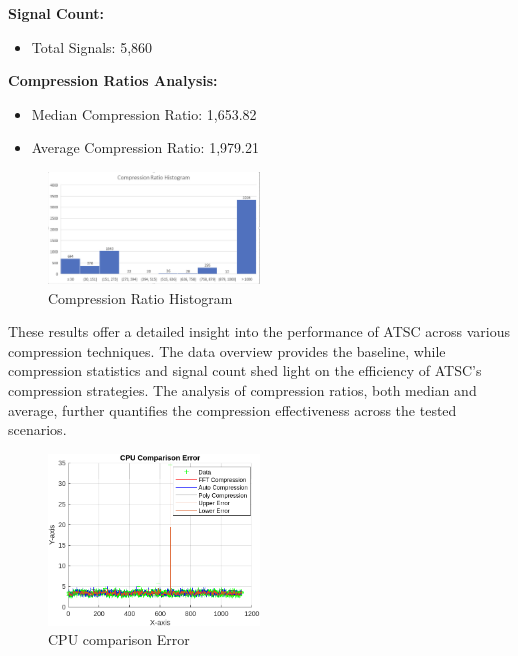 \documentclass[conference]{IEEEtran}
\begin{document}
\textbf{Signal Count:}

\begin{itemize}
    \item Total Signals: 5,860
\end{itemize}

\textbf{Compression Ratios Analysis:}

\begin{itemize}
    \item Median Compression Ratio: 1,653.82
    \item Average Compression Ratio: 1,979.21
\end{itemize}

\begin{figure}[h]
  \centering
  \includegraphics[width=0.5\textwidth]{Fig5.png}
  \caption{Compression Ratio Histogram}
  \label{Fig.6}
\end{figure}

\vspace{10pt}
These results offer a detailed insight into the performance of ATSC across various compression techniques. The data overview provides the baseline, while compression statistics and signal count shed light on the efficiency of ATSC's compression strategies. The analysis of compression ratios, both median and average, further quantifies the compression effectiveness across the tested scenarios. 
 

\begin{figure}[h]
  \centering
  \includegraphics[width=0.5\textwidth]{cpu.png}
  \caption{CPU comparison Error}
  \label{cpu}
\end{figure}
\end{document}
